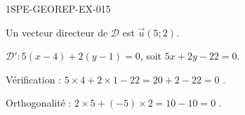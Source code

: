 \begin{corrige}{1SPE-GEOREP-EX-015}


Un vecteur directeur de $\mathcal{D}$ est $\vec{u}(5 ; 2)$.

$\mathcal{D}' : 5(x - 4) + 2(y - 1) = 0$, soit $\boxed{5x + 2y - 22 = 0}$.

Vérification : $5 \times 4 + 2 \times 1 - 22 = 20 + 2 - 22 = 0$ \checkmark.

Orthogonalité : $2 \times 5 + (-5) \times 2 = 10 - 10 = 0$ \checkmark.

\end{corrige}
